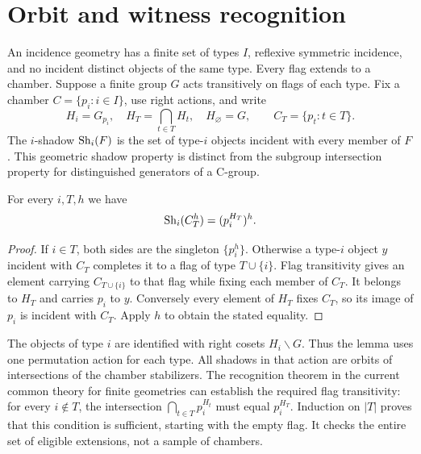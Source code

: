 \section{Orbit and witness recognition}
An incidence geometry has a finite set of types $I$, reflexive symmetric
incidence, and no incident distinct objects of the same type. Every flag
extends to a chamber. Suppose a finite group $G$ acts transitively on flags
of each type. Fix a chamber $C=\{p_i:i\in I\}$, use right actions, and write
\[
 H_i=G_{p_i},\quad H_T=\bigcap_{t\in T}H_t,\quad H_\varnothing=G,
 \qquad C_T=\{p_t:t\in T\}.
\]
The $i$-shadow $\operatorname{Sh}_i(F)$ is the set of type-$i$ objects incident with every
member of $F$. This geometric shadow property is distinct from the
subgroup intersection property for distinguished generators of a C-group.

\begin{lemma}\label{orbit}
For every $i,T,h$ we have
\[
             \operatorname{Sh}_i(C_T^h)=(p_i^{H_T})^h.
\]
\end{lemma}
\begin{proof}
If $i\in T$, both sides are the singleton $\{p_i^h\}$.
Otherwise a type-$i$ object $y$ incident with $C_T$ completes it to a flag
of type $T\cup\{i\}$. Flag transitivity gives an element carrying
$C_{T\cup\{i\}}$ to that flag while fixing each member of $C_T$.
It belongs to $H_T$ and carries $p_i$ to $y$. Conversely every element of
$H_T$ fixes $C_T$, so its image of $p_i$ is incident with $C_T$.
Apply $h$ to obtain the stated equality.
\end{proof}

The objects of type $i$ are identified with right cosets $H_i\backslash G$.
Thus the lemma uses one permutation action for each type. All shadows in
that action are orbits of intersections of the chamber stabilizers.
The recognition theorem in the current common theory for finite geometries
can establish the required flag transitivity: for every $i\notin T$, the
intersection $\bigcap_{t\in T}p_i^{H_t}$ must equal $p_i^{H_T}$.
Induction on $|T|$ proves that this condition is sufficient, starting with
the empty flag. It checks the entire set of eligible extensions, not a
sample of chambers.

